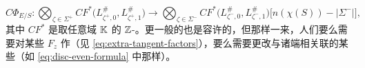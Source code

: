 \begin{equation*}
C\Phi_{E/S}\colon\bigotimes_{\zeta\in\Sigma^{+}}CF^{*}\bigl(L^{\#}_{\zeta^{+},0},L^{\#}_{\zeta^{+},1}\bigr)\longrightarrow\bigotimes_{\zeta\in\Sigma^{-}}CF^{*}\bigl(L^{\#}_{\zeta^{-},0},L^{\#}_{\zeta^{-},1}\bigr)\bigl[n(\chi(S))-|\Sigma^{-}|\bigr],
\end{equation*}
其中 $CF^{*}$ 是取任意\trCoefficients{}域 $\mathbb{K}$ 的 $\mathbb{Z}$-\trGraded\trFloer\trCochainComplex。更一般的\trSurface{}也是容许的，但那样一来，人们要么需要对某些 $F_z$ 作\trOrientation（见 \eqref{eq:extra-tangent-factors}），要么需要更改与诸端相关联的某些\trBraneStructure（如 \eqref{eq:disc-even-formula} 中那样）。
